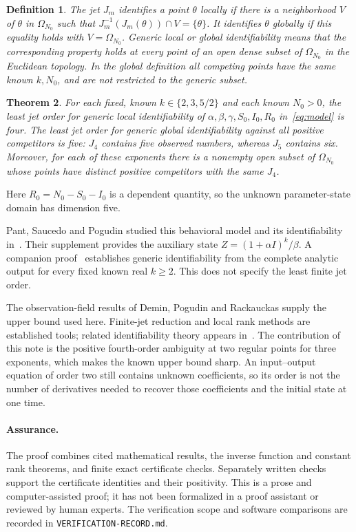 \documentclass[10pt,a4paper]{article}
\newtheorem{theorem}{Theorem}
\newtheorem{definition}[theorem]{Definition}
\begin{document}
\begin{definition}
\label{def:minimal}
The jet $J_m$ identifies a point $\theta$ locally if there is a
neighborhood $V$ of $\theta$ in $\Omega_{N_0}$ such that
$J_m^{-1}(J_m(\theta))\cap V=\{\theta\}$. It identifies $\theta$
globally if this equality holds with $V=\Omega_{N_0}$.
Generic local or global identifiability means that the corresponding
property holds at every point of an open dense subset of $\Omega_{N_0}$
in the Euclidean topology. In the global definition all competing points
have the same known $k,N_0$, and are not restricted to the generic subset.
\end{definition}

\begin{theorem}
\label{thm:main}
For each fixed, known $k\in\{2,3,5/2\}$ and each known $N_0>0$,
the least jet order for generic local identifiability of
$\alpha,\beta,\gamma,S_0,I_0,R_0$ in~\eqref{eq:model} is four.
The least jet order for generic global identifiability against all
positive competitors is five: $J_4$ contains five observed numbers,
whereas $J_5$ contains six. Moreover, for each of these exponents
there is a nonempty open subset of $\Omega_{N_0}$ whose points have
distinct positive competitors with the same $J_4$.
\end{theorem}
Here $R_0=N_0-S_0-I_0$ is a dependent quantity, so the unknown
parameter-state domain has dimension five.

Pant, Saucedo and Pogudin studied this behavioral model and its
identifiability in~\cite[Section 3.6 and Supplement S9]{PSP,PSPsupp}.
Their supplement provides the auxiliary state
$Z=(1+\alpha I)^k/\beta$. A companion proof~\cite{Companion}
establishes generic identifiability from the complete analytic output
for every fixed known real $k\geq2$. This does not specify the least
finite jet order.

The observation-field results of Demin, Pogudin and Rackauckas
\cite[Theorem 4.12 and Remark 4.18]{DPR} supply the upper bound used
here. Finite-jet reduction and local rank methods are established tools;
related identifiability theory appears in~\cite{HOPY,OPT}. The contribution
of this note is the positive fourth-order ambiguity at two regular
points for three exponents, which makes the known upper bound sharp.
An input--output equation of order two still contains unknown
coefficients, so its order is not the number of derivatives needed to
recover those coefficients and the initial state at one time.

\paragraph{Assurance.}
The proof combines cited mathematical results, the inverse function
and constant rank theorems, and finite exact certificate checks.
Separately written checks support the certificate identities and their
positivity. This is a prose and computer-assisted proof; it has not been
formalized in a proof assistant or reviewed by human experts. The
verification scope and software comparisons are recorded in
\texttt{VERIFICATION-RECORD.md}.
\end{document}
